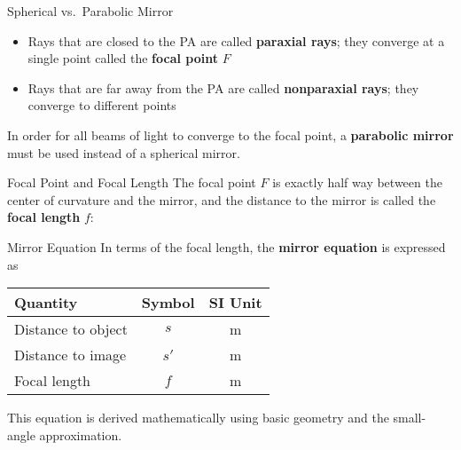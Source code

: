 \documentclass[12pt,compress,aspectratio=169]{beamer}
\begin{document}
\begin{frame}{Spherical vs.\ Parabolic Mirror}
  \begin{itemize}
  \item Rays that are closed to the PA are called \textbf{paraxial rays}; they
    converge at a single point called the \textbf{focal point} $F$
  \item Rays that are far away from the PA are called \textbf{nonparaxial rays};
    they converge to different points
  \end{itemize}
  \begin{center}
  \end{center}
  In order for all beams of light to converge to the focal point, a
  \textbf{parabolic mirror} must be used instead of a spherical mirror.
\end{frame}



\begin{frame}{Focal Point and Focal Length}
  The focal point $F$ is exactly half way between the center of curvature and
  the mirror, and the distance to the mirror is called the \textbf{focal length}
  $f$:

  \begin{center}
  \end{center}
  
\end{frame}


\begin{frame}{Mirror Equation}
  In terms of the focal length, the \textbf{mirror equation} is expressed as

  \begin{center}
    \begin{tabular}{l|c|c}
      \rowcolor{pink}
      \textbf{Quantity} & \textbf{Symbol} & \textbf{SI Unit} \\ \hline
      Distance to object & $s$  & \si{\metre} \\
      Distance to image  & $s'$ & \si{\metre} \\
      Focal length       & $f$  & \si{\metre} 
    \end{tabular}
  \end{center}
  This equation is derived mathematically using basic geometry and the
  small-angle approximation.
\end{frame}
\end{document}
